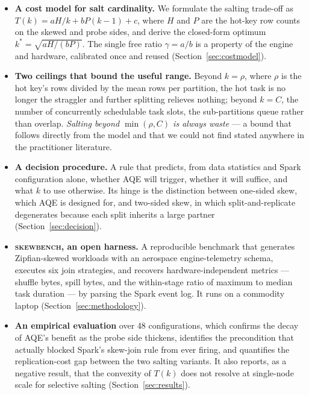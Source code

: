 \begin{itemize}
\item \textbf{A cost model for salt cardinality.} We formulate the salting
trade-off as $T(k) = aH/k + bP(k-1) + c$, where $H$ and $P$ are the hot-key row
counts on the skewed and probe sides, and derive the closed-form optimum
$k^{*}=\sqrt{aH/(bP)}$. The single free ratio $\gamma = a/b$ is a property of
the engine and hardware, calibrated once and reused
(Section~\ref{sec:costmodel}).

\item \textbf{Two ceilings that bound the useful range.} Beyond
$k=\rho$, where $\rho$ is the hot key's rows divided by the mean rows per
partition, the hot task is no longer the straggler and further splitting
relieves nothing; beyond $k=C$, the number of concurrently schedulable task
slots, the sub-partitions queue rather than overlap. \emph{Salting beyond
$\min(\rho, C)$ is always waste} --- a bound that follows directly from the
model and that we could not find stated anywhere in the practitioner
literature.

\item \textbf{A decision procedure.} A rule that predicts, from data statistics
and Spark configuration alone, whether AQE will trigger, whether it will
suffice, and what $k$ to use otherwise. Its hinge is the distinction between
one-sided skew, which AQE is designed for, and two-sided skew, in which
split-and-replicate degenerates because each split inherits a large partner
(Section~\ref{sec:decision}).

\item \textbf{\textsc{skewbench}, an open harness.} A reproducible benchmark
that generates Zipfian-skewed workloads with an aerospace engine-telemetry
schema, executes six join strategies, and recovers hardware-independent metrics
--- shuffle bytes, spill bytes, and the within-stage ratio of maximum to median
task duration --- by parsing the Spark event log. It runs on a commodity laptop
(Section~\ref{sec:methodology}).

\item \textbf{An empirical evaluation} over 48 configurations, which confirms
the decay of AQE's benefit as the probe side thickens, identifies the
precondition that actually blocked Spark's skew-join rule from ever firing, and
quantifies the replication-cost gap between the two salting variants. It also
reports, as a negative result, that the convexity of $T(k)$ does not resolve at
single-node scale for selective salting (Section~\ref{sec:results}).
\end{itemize}

